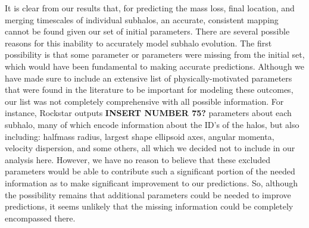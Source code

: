 \documentclass[fleqn,usenatbib]{mnras}
\newcommand\edits[1]{{\color{red}#1}}
\begin{document}
It is clear from our results that, for predicting the mass loss, final location, and merging timescales of individual subhalos, an accurate, consistent mapping cannot be found given our set of initial parameters. There are several possible reasons for this inability to accurately model subhalo evolution. The first possibility is that some parameter or parameters were missing from the initial set, which would have been fundamental to making accurate predictions. Although we have made sure to include an extensive list of physically-motivated parameters that were found in the literature to be important for modeling these outcomes, our list was not completely comprehensive with all possible information. For instance, Rockstar outputs \edits{\textbf{INSERT NUMBER 75?}} parameters about each subhalo, many of which encode information about the ID's of the halos, but also including: halfmass radius, largest shape ellipsoid axes, angular momenta, velocity dispersion, and some others, all which we decided not to include in our analysis here. However, we have no reason to believe that these excluded parameters would be able to contribute such a significant portion of the needed information as to make significant improvement to our predictions. So, although the possibility remains that additional parameters could be needed to improve predictions, it seems unlikely that the missing information could be completely encompassed there.
\end{document}
